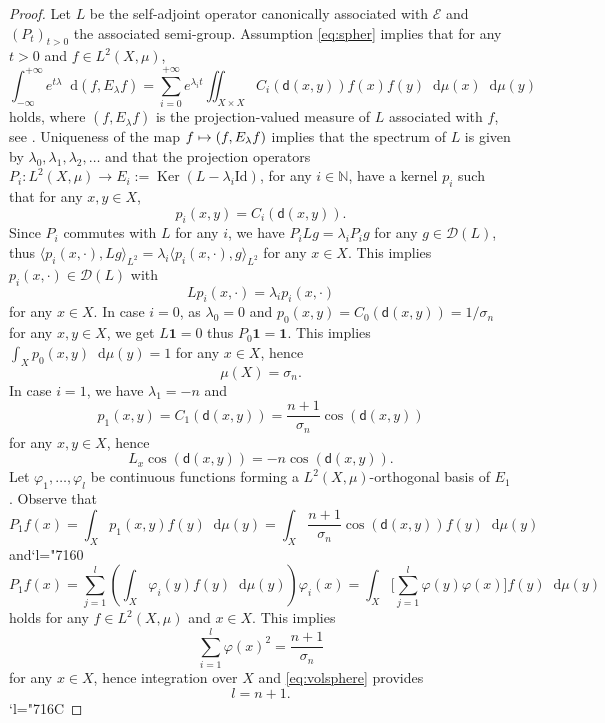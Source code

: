 \documentclass[JEP,XML,SOM,Unicode,published]{cedram}
\newcommand\mto{\mathchoice{\longmapsto}{\mapsto}{\mapsto}{\mapsto}}
\DeclareMathOperator{\Ker}{Ker}
\newcommand{\Changel}{\mathcode`l="7160}
\newcommand{\Changelback}{\mathcode`l="716C}
\theoremstyle{plain}
\theoremstyle{definition}
\newcommand{\setN}{\mathbb{N}}
\newcommand{\cE}{\mathcal{E}}
\newcommand{\cD}{\mathcal{D}}
\let\phi\varphi
\newcommand{\di}{\mathop{}\!\mathrm{d}}
\newcommand{\dist}{\mathsf{d}}
\begin{document}
\begin{proof}
Let $L$ be the self-adjoint operator canonically associated with $\cE$ and $(P_t)_{t>0}$ the associated semi-group. Assumption \eqref{eq:spher} implies that for any $t>0$ and $f \in L^2(X,\mu)$,
\[
\int_{-\infty}^{+\infty} e^{t \lambda} \di (f,E_\lambda f) = \sum_{i=0}^{+\infty} e^{\lambda_i t} \iint_{X\times X} C_i(\dist(x,y)) f(x) f(y) \di \mu(x) \di \mu(y)
\]
holds, where $(f,E_\lambda f)$ is the projection-valued measure of $L$ associated with $f$, see \eg \cite[p.\,262--263]{ReedSimon}. Uniqueness of the map $f \mto (f,E_\lambda f)$ implies that the spectrum of $L$ is given by $\lambda_0, \lambda_1, \lambda_2, \ldots$ and that the projection operators $P_i: L^2(X,\mu) \to E_i:=\Ker(L-\lambda_i \mathrm{Id})$, for any $i \in \setN$, have a kernel $p_i$ such that for any $x,y \in X$,
\[
p_i(x,y)=C_i(\dist(x,y)).
\]
Since $P_i$ commutes with $L$ for any $i$, we have $P_i Lg = \lambda_i P_i g$ for any $g \in \cD(L)$, thus $
\langle p_i(x,\cdot), Lg \rangle_{L^2} = \lambda_i \langle p_i(x,\cdot), g \rangle_{L^2}$
for any $x \in X$. This implies $p_i(x,\cdot) \in \cD(L)$ with
\[
Lp_i(x,\cdot)=\lambda_i p_i(x,\cdot)
\]
for any $x \in X$. In case $i=0$, as $\lambda_0=0$ and $p_0(x,y)=C_0(\dist(x,y))=1/\sigma_n$ for any $x, y \in X$, we get $L\textbf{1}=0$ thus $P_0 \textbf{1}=\textbf{1}$. This implies $\int_Xp_0(x,y) \di \mu(y)=1$ for any $x \in X$, hence
\begin{equation}\label{eq:volsphere}
\mu(X) = \sigma_n.
\end{equation}
In case $i=1$, we have $\lambda_1=-n$ and
\[
p_1(x,y)=C_1(\dist(x,y))=\frac{n+1}{\sigma_n} \cos(\dist(x,y))
\]
for any $x,y \in X$, hence
\begin{equation}\label{eq:cosdist}
L_x\cos(\dist(x,y)) = - n \cos(\dist(x,y)).
\end{equation}
Let $\phi_1,\ldots, \phi_l$ be continuous functions forming a $L^2(X,\mu)$-orthogonal basis of $E_1$. Observe that
\begin{equation}\label{eq:p1}
P_1f(x) = \int_X p_1(x,y) f(y) \di \mu(y) = \int_X\frac{n+1}{\sigma_n} \cos(\dist(x,y)) f(y) \di \mu(y)
\end{equation}
and\Changel
\[
P_1f(x)=\sum_{j=1}^l \left(\int_X \phi_i(y) f(y) \di \mu(y)\right)\phi_i(x)= \int_X \biggl[\sum_{j=1}^l \phi(y)\phi(x)\biggr] f(y)\di \mu(y)
\]
holds for any $f \in L^2(X,\mu)$ and $x \in X$. This implies
\[
\sum_{i=1}^l\phi(x)^2 = \frac{n+1}{\sigma_n}
\]
for any $x \in X$, hence integration over $X$ and \eqref{eq:volsphere} provides
\[
l=n+1.
\]
\Changelback

\end{proof}
\end{document}
